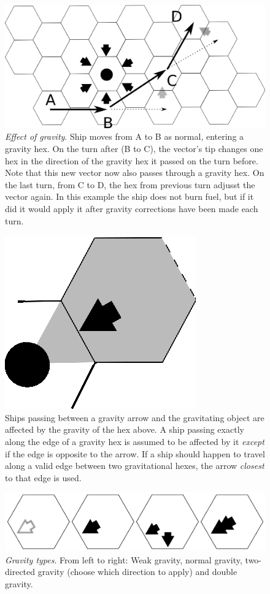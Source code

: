 \documentclass[a4paper,12pt,notitlepage,twocolumn]{article}
\begin{document}
\begin{figure}[h!]\centering  
  \includegraphics[width=0.5 \textwidth]{data/move_4.eps}  
  \caption{\footnotesize \emph{Effect of gravity}. Ship moves from A to B as normal, entering a
    gravity hex. 
    On the turn after (B to C), the vector's tip changes one hex
    in the direction of the gravity hex it passed on the turn
    before. Note that this new vector now also passes through a gravity
    hex. On the last turn, from C to D, the hex from previous turn adjusst
    the vector again. In this example the ship does not burn fuel, but
    if it did it would apply it after gravity corrections have been
    made each turn.}
\label{fig:4}
\end{figure}
\begin{figure}[h!]\centering  
  \includegraphics[width=0.10 \textwidth]{data/move_6.eps}  
  \caption{\footnotesize Ships passing between a gravity arrow and the gravitating
    object are affected by the gravity of the hex above. A
    ship passing exactly along the edge of a gravity hex is assumed to be
  affected by it \emph{except} if the edge is opposite to the arrow. 
  If a ship should happen to travel along a valid edge between two
  gravitational hexes, the arrow \emph{closest} to that edge is used.} 
\label{fig:6}
\end{figure}

\begin{figure}[h!]\centering  
  \includegraphics[width=0.5 \textwidth]{data/move_8.eps}  
  \caption{\footnotesize \emph{Gravity types}. From left to right: Weak gravity, normal gravity,
    two-directed gravity (choose which direction to apply) and double gravity.}
\label{fig:8}
\end{figure}
\end{document}
